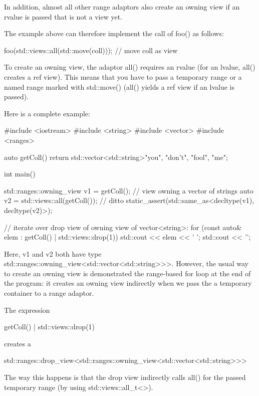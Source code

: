 In addition, almost all other range adaptors also create an owning view if an rvalue is passed that is not a view yet.

The example above can therefore implement the call of foo() as follows:

\begin{cpp}
foo(std::views::all(std::move(coll))); // move coll as view
\end{cpp}

To create an owning view, the adaptor all() requires an rvalue (for an lvalue, all() creates a ref view). This means that you have to pass a temporary range or a named range marked with std::move() (all() yields a ref view if an lvalue is passed).

Here is a complete example:


\begin{cpp}
#include <iostream>
#include <string>
#include <vector>
#include <ranges>

auto getColl()
{
	return std::vector<std::string>{"you", "don't", "fool", "me"};
}

int main()
{
	std::ranges::owning_view v1 = getColl(); // view owning a vector of strings
	auto v2 = std::views::all(getColl()); // ditto
	static_assert(std::same_as<decltype(v1), decltype(v2)>);
	
	// iterate over drop view of owning view of vector<string>:
	for (const auto& elem : getColl() | std::views::drop(1)) {
		std::cout << elem << ' ';
	}
	std::cout << '\n';
}
\end{cpp}

Here, v1 and v2 both have type std::ranges::owning\_view<std::vector<std::string>>>. However, the usual way to create an owning view is demonstrated the range-based for loop at the end of the program: it creates an owning view indirectly when we pass the a temporary container to a range adaptor.

The expression

\begin{cpp}
getColl() | std::views::drop(1)
\end{cpp}

creates a

\begin{cpp}
std::ranges::drop_view<std::ranges::owning_view<std::vector<std::string>>>
\end{cpp}

The way this happens is that the drop view indirectly calls all() for the passed temporary range (by using std::views::all\_t<>).

